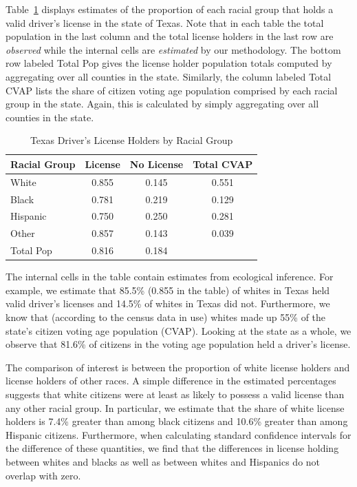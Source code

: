 \documentclass[12pt]{article}
\begin{document}
Table~\ref{cvap_f3_ex} displays estimates of the proportion of
each racial group that holds a valid driver's license in the state of Texas. Note that in each
table the total population in the last column and the total license holders in
the last row are {\it observed} while the internal cells are {\it estimated} 
by our methodology. The bottom row labeled Total Pop
gives the license holder population totals computed by aggregating over all counties in the state. 
Similarly, the column labeled Total CVAP lists the
share of citizen voting age population comprised by each racial group
in the state.  Again, this is calculated by simply aggregating over
all counties in the state.

\begin{table}[ht]
\begin{center}
\caption{\label{cvap_f3_ex}Texas Driver's License Holders by Racial Group}
\begin{tabular}{lccc}
  \hline
Racial Group & License & No License & Total CVAP\\
  \hline
White & 0.855 & 0.145 & 0.551 \\ 
Black & 0.781 & 0.219 & 0.129 \\ 
Hispanic & 0.750 & 0.250 & 0.281 \\ 
Other & 0.857 & 0.143 & 0.039 \\ 
Total Pop & 0.816 & 0.184 &   \\ 
   \hline

\end{tabular}
\end{center}
\end{table}

The internal cells in the table contain estimates from ecological
inference. For example, we estimate that 85.5\% (0.855 in the table) of
whites in Texas held valid driver's licenses and 14.5\%
of whites in Texas did not.
Furthermore, we know that (according to the census data in use) whites made up 55\% of the state's
citizen voting age population (CVAP).  Looking at the state as a whole, we
observe that 81.6\% of citizens in the voting age population held a driver's license. 

The comparison of interest is between the proportion of white license holders and license holders of other races. A simple difference in the estimated percentages suggests that white citizens were at least as likely to possess a valid license than any other racial group. In particular, we estimate that the share of white license holders is 7.4\% greater than among black citizens and 10.6\% greater than among Hispanic citizens. Furthermore, when calculating standard confidence intervals for the difference of these quantities, we find that the differences in license holding between whites and blacks as well as between whites and Hispanics do not overlap with zero.
\end{document}
